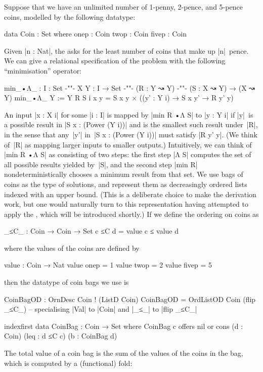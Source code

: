 Suppose that we have an unlimited number of 1-penny, 2-pence, and 5-pence coins, modelled by the following datatype:
\begin{code}
data Coin : Set where
  onep   : Coin
  twop   : Coin
  fivep  : Coin
\end{code}
Given |n : Nat|, the  asks for the least number of coins that make up |n|~pence.
We can give a relational specification of the problem with the following ``minimisation'' operator:
\begin{code}
min_•Λ_ : {I : Set} {-"\kern-1pt"-} {X Y : I → Set} {-"\kern-1pt"-} (R : Y ↝ Y) {-"\kern-1pt"-} (S : X ↝ Y) → (X ↝ Y)
min_•Λ_ {Y := Y} R S {i} x y = S x y × ((y' : Y i) → S x y' → R y' y)
\end{code}
An input |x : X i| for some |i : I| is mapped by |min R •Λ S| to |y : Y i| if |y|~is a possible result in |S x : (Power (Y i))| and is the smallest such result under~|R|, in the sense that any~|y'| in~|S x : (Power (Y i))| must satisfy |R y' y|.
(We think of~|R| as mapping larger inputs to smaller outputs.)
Intuitively, we can think of |min R •Λ S| as consisting of two steps: the first step |Λ S| computes the set of all possible results yielded by~|S|, and the second step |min R| nondeterministically chooses a minimum result from that set.
We use bags of coins as the type of solutions, and represent them as decreasingly ordered lists indexed with an upper bound.
(This is a deliberate choice to make the derivation work, but one would naturally turn to this representation having attempted to apply the , which will be introduced shortly.)
If we define the ordering on coins as
\begin{code}
_≤C_ : Coin → Coin → Set
c ≤C d = value c ≤ value d
\end{code}
where the values of the coins are defined by
\begin{code}
value : Coin → Nat
value  onep   =  1
value  twop   =  2
value  fivep  =  5
\end{code}
then the datatype of coin bags we use is
\begin{code}
CoinBagOD : OrnDesc Coin ! (ListD Coin)
CoinBagOD = OrdListOD Coin (flip _≤C_)
-- specialising |Val| to |Coin| and |_≤_| to |flip _≤C_|

indexfirst data CoinBag : Coin → Set where
  CoinBag c  offers  nil
             or      cons  (d : Coin) (leq : d ≤C c) (b : CoinBag d)
\end{code}
The total value of a coin bag is the sum of the values of the coins in the bag, which is computed by a (functional) fold:
